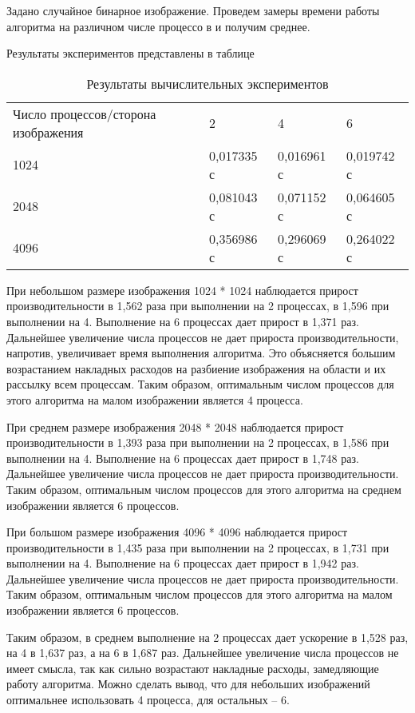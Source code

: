 \documentclass{report}
\begin{document}
\par Задано  случайное  бинарное  изображение.  Проведем  замеры  времени  работы алгоритма на различном числе процессо в и получим среднее. 
\par Результаты экспериментов представлены в таблице

\begin{table}[!h]
\caption{Результаты вычислительных экспериментов}
\centering
\begin{tabular}{p{3cm} p{4cm} p{4cm} p{4cm}}
Число процессов/сторона изображения & 2 & 4 & 6 \\
1024     & 0,017335 с &  0,016961 с & 0,019742 с\\
2048     & 0,081043 с & 0,071152 с & 0,064605 с  \\
4096     & 0,356986 с & 0,296069 с & 0,264022 с \\
  

\end{tabular}
\end{table}

\par При  небольшом  размере  изображения  1024  *  1024  наблюдается  прирост производительности в 1,562 раза при выполнении на 2 процессах, в 1,596 при выполнении на 4. Выполнение на 6 процессах дает прирост в 1,371 раз. Дальнейшее увеличение числа процессов  не  дает  прироста  производительности,  напротив,  увеличивает  время выполнения алгоритма. Это объясняется большим возрастанием накладных расходов на разбиение  изображения  на  области  и  их  рассылку  всем  процессам.   Таким  образом, оптимальным числом процессов для этого алгоритма на малом изображении является 4 процесса.
\par При  среднем  размере  изображения  2048  *  2048  наблюдается  прирост производительности в 1,393 раза при выполнении на 2 процессах, в 1,586 при выполнении на 4. Выполнение на 6 процессах дает прирост в 1,748 раз. Дальнейшее увеличение числа процессов не дает прироста производительности. Таким образом, оптимальным числом процессов для этого алгоритма на среднем изображении является 6 процессов.
\par При  большом  размере  изображения  4096  *  4096  наблюдается  прирост производительности в 1,435 раза при выполнении на 2 процессах, в 1,731  при выполнении на 4. Выполнение на 6 процессах дает прирост в 1,942 раз. Дальнейшее увеличение числа процессов не дает прироста производительности. Таким образом, оптимальным числом процессов для этого алгоритма на малом изображении является 6 процессов.
\par Таким образом, в среднем выполнение на 2 процессах дает ускорение в 1,528 раз, на  4  в  1,637  раз,  а  на  6 в  1,687  раз.  Дальнейшее  увеличение  числа  процессов  не  имеет смысла, так как сильно возрастают накладные расходы, замедляющие работу алгоритма. Можно  сделать  вывод,  что  для  небольших  изображений  оптимальнее использовать  4 процесса, для остальных – 6.
\newpage
\end{document}
